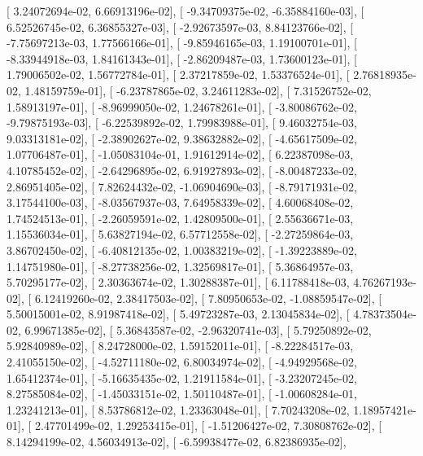 \documentclass{article}
\begin{document}
       [  3.24072694e-02,   6.66913196e-02],
       [ -9.34709375e-02,  -6.35884160e-03],
       [  6.52526745e-02,   6.36855327e-03],
       [ -2.92673597e-03,   8.84123766e-02],
       [ -7.75697213e-03,   1.77566166e-01],
       [ -9.85946165e-03,   1.19100701e-01],
       [ -8.33944918e-03,   1.84161343e-01],
       [ -2.86209487e-03,   1.73600123e-01],
       [  1.79006502e-02,   1.56772784e-01],
       [  2.37217859e-02,   1.53376524e-01],
       [  2.76818935e-02,   1.48159759e-01],
       [ -6.23787865e-02,   3.24611283e-02],
       [  7.31526752e-02,   1.58913197e-01],
       [ -8.96999050e-02,   1.24678261e-01],
       [ -3.80086762e-02,  -9.79875193e-03],
       [ -6.22539892e-02,   1.79983988e-01],
       [  9.46032754e-03,   9.03313181e-02],
       [ -2.38902627e-02,   9.38632882e-02],
       [ -4.65617509e-02,   1.07706487e-01],
       [ -1.05083104e-01,   1.91612914e-02],
       [  6.22387098e-03,   4.10785452e-02],
       [ -2.64296895e-02,   6.91927893e-02],
       [ -8.00487233e-02,   2.86951405e-02],
       [  7.82624432e-02,  -1.06904690e-03],
       [ -8.79171931e-02,   3.17544100e-03],
       [ -8.03567937e-03,   7.64958339e-02],
       [  4.60068408e-02,   1.74524513e-01],
       [ -2.26059591e-02,   1.42809500e-01],
       [  2.55636671e-03,   1.15536034e-01],
       [  5.63827194e-02,   6.57712558e-02],
       [ -2.27259864e-03,   3.86702450e-02],
       [ -6.40812135e-02,   1.00383219e-02],
       [ -1.39223889e-02,   1.14751980e-01],
       [ -8.27738256e-02,   1.32569817e-01],
       [  5.36864957e-03,   5.70295177e-02],
       [  2.30363674e-02,   1.30288387e-01],
       [  6.11788418e-03,   4.76267193e-02],
       [  6.12419260e-02,   2.38417503e-02],
       [  7.80950653e-02,  -1.08859547e-02],
       [  5.50015001e-02,   8.91987418e-02],
       [  5.49723287e-03,   2.13045834e-02],
       [  4.78373504e-02,   6.99671385e-02],
       [  5.36843587e-02,  -2.96320741e-03],
       [  5.79250892e-02,   5.92840989e-02],
       [  8.24728000e-02,   1.59152011e-01],
       [ -8.22284517e-03,   2.41055150e-02],
       [ -4.52711180e-02,   6.80034974e-02],
       [ -4.94929568e-02,   1.65412374e-01],
       [ -5.16635435e-02,   1.21911584e-01],
       [ -3.23207245e-02,   8.27585084e-02],
       [ -1.45033151e-02,   1.50110487e-01],
       [ -1.00608284e-01,   1.23241213e-01],
       [  8.53786812e-02,   1.23363048e-01],
       [  7.70243208e-02,   1.18957421e-01],
       [  2.47701499e-02,   1.29253415e-01],
       [ -1.51206427e-02,   7.30808762e-02],
       [  8.14294199e-02,   4.56034913e-02],
       [ -6.59938477e-02,   6.82386935e-02],
\end{document}
